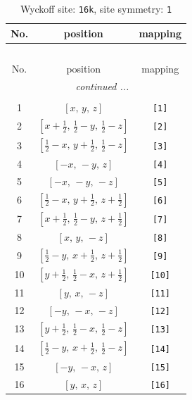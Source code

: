 \documentclass[fleqn,8pt]{jsarticle}
\begin{document}
\begin{longtable}{ccc}
\caption{Wyckoff site: {\tt 16k}, site symmetry: {\tt 1}}
 \\
 \hline \hline
No. & position & mapping \\ \hline \endfirsthead

\multicolumn{2}{l}{\tablename\ \thetable{}} \\
 \hline \hline
No. & position & mapping \\ \hline \endhead

 \hline \hline
\multicolumn{2}{r}{\footnotesize\it continued ...} \\ \endfoot

 \hline \hline
\multicolumn{2}{r}{} \\ \endlastfoot

1 & $\left[ x,\, y,\, z \right]$ & {\tt [1]} \\ \hline
2 & $\left[ x + \frac{1}{2},\, \frac{1}{2} - y,\, \frac{1}{2} - z \right]$ & {\tt [2]} \\ \hline
3 & $\left[ \frac{1}{2} - x,\, y + \frac{1}{2},\, \frac{1}{2} - z \right]$ & {\tt [3]} \\ \hline
4 & $\left[ - x,\, - y,\, z \right]$ & {\tt [4]} \\ \hline
5 & $\left[ - x,\, - y,\, - z \right]$ & {\tt [5]} \\ \hline
6 & $\left[ \frac{1}{2} - x,\, y + \frac{1}{2},\, z + \frac{1}{2} \right]$ & {\tt [6]} \\ \hline
7 & $\left[ x + \frac{1}{2},\, \frac{1}{2} - y,\, z + \frac{1}{2} \right]$ & {\tt [7]} \\ \hline
8 & $\left[ x,\, y,\, - z \right]$ & {\tt [8]} \\ \hline
9 & $\left[ \frac{1}{2} - y,\, x + \frac{1}{2},\, z + \frac{1}{2} \right]$ & {\tt [9]} \\ \hline
10 & $\left[ y + \frac{1}{2},\, \frac{1}{2} - x,\, z + \frac{1}{2} \right]$ & {\tt [10]} \\ \hline
11 & $\left[ y,\, x,\, - z \right]$ & {\tt [11]} \\ \hline
12 & $\left[ - y,\, - x,\, - z \right]$ & {\tt [12]} \\ \hline
13 & $\left[ y + \frac{1}{2},\, \frac{1}{2} - x,\, \frac{1}{2} - z \right]$ & {\tt [13]} \\ \hline
14 & $\left[ \frac{1}{2} - y,\, x + \frac{1}{2},\, \frac{1}{2} - z \right]$ & {\tt [14]} \\ \hline
15 & $\left[ - y,\, - x,\, z \right]$ & {\tt [15]} \\ \hline
16 & $\left[ y,\, x,\, z \right]$ & {\tt [16]} \\
\end{longtable}
\end{document}
